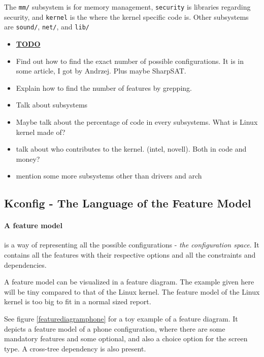 \documentclass[a4paper,11pt]{report}
\newcommand{\figa}{
    \begin{figure}[!htpb]
    \centering
}
\newcommand{\figb}[2]{
    \caption{#1}
    \label{#2}
    \end{figure}
}
\begin{document}
The \texttt{mm/} subsystem is for memory management, \texttt{security} is 
libraries regarding security, and \texttt{kernel} is the where the kernel 
specific code is. Other subsystems are \texttt{sound/}, \texttt{net/}, and 
\texttt{lib/}



\begin{itemize}
    \item \underline{\textbf{TODO}}
    \item Find out how to find the exact number of possible configurations. It 
        is in some article, I got by Andrzej. Plus maybe SharpSAT.
    \item Explain how to find the number of features by grepping.
    \item Talk about subsystems
    \item Maybe talk about the percentage of code in every subsystems. What is 
        Linux kernel made of?
    \item talk about who contributes to the kernel. (intel, novell). Both in 
        code and money?
    \item mention some more subsystems other than drivers and arch
\end{itemize}


        \subsection{Kconfig - The Language of the Feature Model}

            \paragraph{A feature model} 
is a way of representing all the possible configurations - \emph{the 
configuration space}. It contains all the features with their respective 
options and all the constraints and dependencies.

A feature model can be visualized in a feature diagram. The example given here 
will be tiny compared to that of the Linux kernel. The feature model of the 
Linux kernel is too big to fit in a normal sized report.

See figure \ref{featurediagramphone} for a toy example of a feature 
diagram. It depicts a feature model of a phone configuration, where there are 
some mandatory features and some optional, and also a choice option for the 
screen type. A cross-tree dependency is also present.
\end{document}
